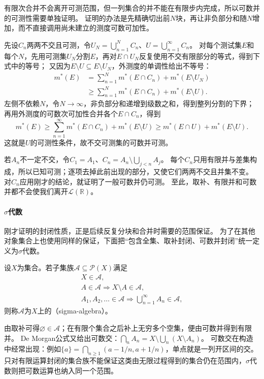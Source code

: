 有限次合并不会离开可测范围，但一列集合的并不能在有限步内完成，所以可数并的可测性需要单独证明。
证明的办法是先精确切出前$N$块，再让非负部分和随$N$增加，而不直接调用尚未建立的测度可数可加性。

先设$C_n$两两不交且可测，令$U_N=\bigcup_{n=1}^NC_n$、$U=\bigcup_{n=1}^{\infty}C_n$。
对每个测试集$E$和每个$N$，先用可测集$U_N$分割$E$，再对$E\cap U_N$反复使用不交有限部分的等式，得到下式中的等号；
又因为$E\setminus U\subseteq E\setminus U_N$，外测度的单调性给出不等号：
\[
 \begin{aligned}
 m^*(E)
 &=\sum_{n=1}^Nm^*(E\cap C_n)+m^*(E\setminus U_N)\\
 &\geq\sum_{n=1}^Nm^*(E\cap C_n)+m^*(E\setminus U).
 \end{aligned}
\]
左侧不依赖$N$，令$N\to\infty$，非负部分和递增到级数之和，得到整列分割的下界；再用外测度的可数次可加性合并各个$E\cap C_n$，得到
\[
 m^*(E)\geq\sum_{n=1}^{\infty}m^*(E\cap C_n)+m^*(E\setminus U)
 \geq m^*(E\cap U)+m^*(E\setminus U).
\]
这就是$U$的可测性条件，故不交可测集的可数并可测。

若$A_n$不一定不交，令$C_1=A_1$、$C_n=A_n\setminus\bigcup_{j<n}A_j$。
每个$C_n$只用有限并与差集构成，所以已知可测；逐项去掉此前出现的部分，又使它们两两不交且并集不变。
对$C_n$应用刚才的结论，就证明了一般可数并仍可测。
至此，取补、有限并和可数并都不会使我们离开$\mathcal L(\mathbb R)$。

\paragraph{$\sigma$代数}

刚才证明的封闭性质，正是后续反复分块和合并时需要的范围保证。
为了在其他对象集合上也使用同样的保证，下面把“包含全集、取补封闭、可数并封闭”统一定义为$\sigma$代数。
\begin{definition}[$\sigma$代数]
\label{def:analysis-sigma-algebra}
设$X$为集合。若子集族$\mathcal A\subseteq\mathcal P(X)$满足
\[
 \begin{gathered}
 X\in\mathcal A,\\
 A\in\mathcal A\Longrightarrow X\setminus A\in\mathcal A,\\
 A_1,A_2,\ldots\in\mathcal A
 \Longrightarrow\bigcup_{n=1}^{\infty}A_n\in\mathcal A,
 \end{gathered}
\]
则称$\mathcal A$为$X$上的（sigma-algebra）。
\end{definition}

由取补可得$\varnothing\in\mathcal A$；在有限个集合之后补上无穷多个空集，便由可数并得到有限并。
De Morgan公式又给出可数交：$\bigcap_nA_n=X\setminus\bigcup_n(X\setminus A_n)$。
可数交在构造中经常出现：例如$\{a\}=\bigcap_{n\geq1}(a-1/n,a+1/n)$，单点就是一列开区间的交。
只对有限运算封闭的集合族不能保证这类由无限过程得到的集合仍在范围内，$\sigma$代数则把可数运算也纳入同一个范围。

